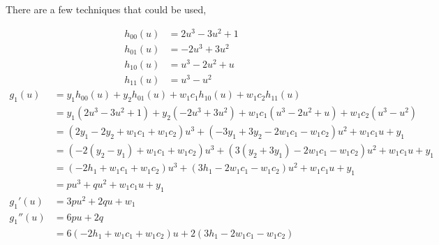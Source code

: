 \documentclass{article}
\begin{document}
There are a few techniques that could be used,

\newcommand{\dx}{\, \mathrm{d}x}
\newcommand{\du}{\, \mathrm{d}u}
\newcommand{\ddx}[1]{\frac{\mathrm{d}#1}{\mathrm{d}x}}

\newpage
\begin{align*}
  h_{00}(u)
  &= 2u^3-3u^2+1 \\
  h_{01}(u)
  &= -2u^3+3u^2 \\
  h_{10}(u)
  &= u^3-2u^2+u \\
  h_{11}(u)
  &= u^3-u^2
\end{align*}
\begin{align*}
  g_1(u)
  &= y_1h_{00}(u)+y_2h_{01}(u)+w_1c_1h_{10}(u)+w_1c_2h_{11}(u) \\
  &= y_1(2u^3-3u^2+1)+y_2(-2u^3+3u^2)+w_1c_1(u^3-2u^2+u)+w_1c_2(u^3-u^2) \\
  &= (2y_1-2y_2+w_1c_1+w_1c_2)u^3+(-3y_1+3y_2-2w_1c_1-w_1c_2)u^2+w_1c_1u+y_1 \\
  &= (-2(y_2-y_1)+w_1c_1+w_1c_2)u^3+(3(y_2+3y_1)-2w_1c_1-w_1c_2)u^2+w_1c_1u+y_1 \\
  &= (-2h_1+w_1c_1+w_1c_2)u^3+(3h_1-2w_1c_1-w_1c_2)u^2+w_1c_1u+y_1 \\
  &= pu^3+qu^2+w_1c_1u+y_1 \\
  g_1'(u)
  &= 3pu^2+2qu+w_1 \\
  g_1''(u)
  &= 6pu+2q \\
  &= 6(-2h_1+w_1c_1+w_1c_2)u+2(3h_1-2w_1c_1-w_1c_2)
\end{align*}
\end{document}
